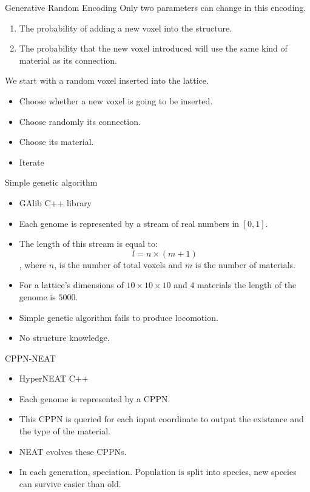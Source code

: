 \documentclass{beamer}
\begin{document}
\begin{frame}{Generative Random Encoding}
Only two parameters can change in this encoding.
\begin{enumerate}
\item The probability of adding a new voxel into the structure.
\item The probability that the new voxel introduced will use the same kind of material as its connection.
\end{enumerate}
We start with a random voxel inserted into the lattice.
\begin{itemize}
\item Choose whether a new voxel is going to be inserted.
\item Choose randomly its connection.
\item Choose its material.
\item Iterate
\end{itemize}
\end{frame}

\begin{frame}{Simple genetic algorithm}
\begin{itemize}
\item GAlib C++ library
\item Each genome is represented by a stream of real numbers in $[ 0,1 ]$.
\item The length of this stream is equal to:
\begin{equation*}
l = n \times (m + 1)
\end{equation*}
, where $n$, is the number of total voxels and $m$ is the number of materials.
\item For a lattice's dimensions of $10 \times 10 \times 10$ and $4$ materials the length of the genome is $5000$.
\item Simple genetic algorithm fails to produce locomotion.
\item No structure knowledge.
\end{itemize}
\end{frame}


\begin{frame}{CPPN-NEAT}
\begin{itemize}
\item HyperNEAT C++
\item Each genome is represented by a CPPN.
\item This CPPN is queried for each input coordinate to output the existance and the type of the material.
\item NEAT evolves these CPPNs.
\item In each generation, speciation. Population is split into species, new species can survive easier than old.
\end{itemize}
\end{frame}
\end{document}
